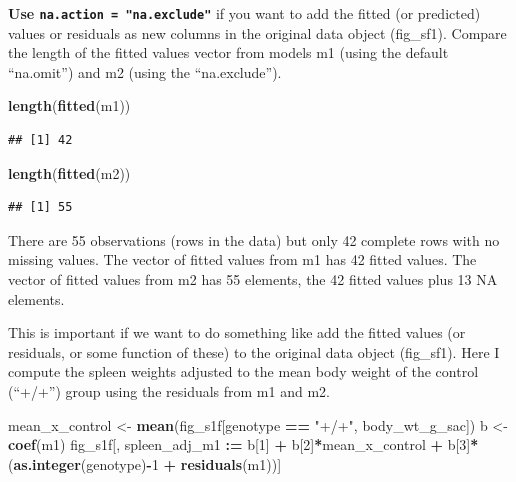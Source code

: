 \documentclass[]{book}
\newenvironment{Shaded}{\begin{snugshade}}{\end{snugshade}}
\newcommand{\DecValTok}[1]{\textcolor[rgb]{0.00,0.00,0.81}{#1}}
\newcommand{\ErrorTok}[1]{\textcolor[rgb]{0.64,0.00,0.00}{\textbf{#1}}}
\newcommand{\KeywordTok}[1]{\textcolor[rgb]{0.13,0.29,0.53}{\textbf{#1}}}
\newcommand{\NormalTok}[1]{#1}
\newcommand{\OperatorTok}[1]{\textcolor[rgb]{0.81,0.36,0.00}{\textbf{#1}}}
\newcommand{\StringTok}[1]{\textcolor[rgb]{0.31,0.60,0.02}{#1}}
\begin{document}
\textbf{Use \texttt{na.action\ =\ "na.exclude"}} if you want to add the fitted (or predicted) values or residuals as new columns in the original data object (fig\_sf1). Compare the length of the fitted values vector from models m1 (using the default ``na.omit'') and m2 (using the ``na.exclude'').

\begin{Shaded}
\begin{Highlighting}[]
\KeywordTok{length}\NormalTok{(}\KeywordTok{fitted}\NormalTok{(m1))}
\end{Highlighting}
\end{Shaded}

\begin{verbatim}
## [1] 42
\end{verbatim}

\begin{Shaded}
\begin{Highlighting}[]
\KeywordTok{length}\NormalTok{(}\KeywordTok{fitted}\NormalTok{(m2))}
\end{Highlighting}
\end{Shaded}

\begin{verbatim}
## [1] 55
\end{verbatim}

There are 55 observations (rows in the data) but only 42 complete rows with no missing values. The vector of fitted values from m1 has 42 fitted values. The vector of fitted values from m2 has 55 elements, the 42 fitted values plus 13 NA elements.

This is important if we want to do something like add the fitted values (or residuals, or some function of these) to the original data object (fig\_sf1). Here I compute the spleen weights adjusted to the mean body weight of the control (``+/+'') group using the residuals from m1 and m2.

\begin{Shaded}
\begin{Highlighting}[]
\NormalTok{mean_x_control <-}\StringTok{ }\KeywordTok{mean}\NormalTok{(fig_s1f[genotype }\OperatorTok{==}\StringTok{ "+/+"}\NormalTok{, body_wt_g_sac])}
\NormalTok{b <-}\StringTok{ }\KeywordTok{coef}\NormalTok{(m1)}
\NormalTok{fig_s1f[, spleen_adj_m1 }\OperatorTok{:}\ErrorTok{=}\StringTok{ }\NormalTok{b[}\DecValTok{1}\NormalTok{] }\OperatorTok{+}
\StringTok{          }\NormalTok{b[}\DecValTok{2}\NormalTok{]}\OperatorTok{*}\NormalTok{mean_x_control }\OperatorTok{+}
\StringTok{          }\NormalTok{b[}\DecValTok{3}\NormalTok{]}\OperatorTok{*}\NormalTok{(}\KeywordTok{as.integer}\NormalTok{(genotype)}\OperatorTok{-}\DecValTok{1} \OperatorTok{+}
\StringTok{          }\KeywordTok{residuals}\NormalTok{(m1))]}
\end{Highlighting}
\end{Shaded}
\end{document}

